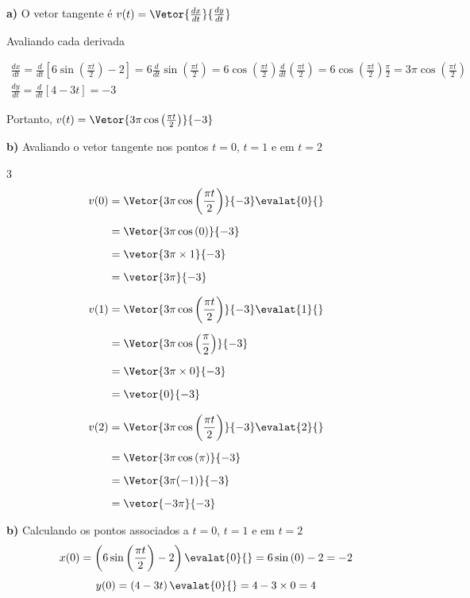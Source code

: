 \documentclass[a4paper,12pt,fleqn]{article}
\begin{document}
\begin{answer}
\textbf{a)} \quad
O vetor tangente é
\(
  v(t) = \Vetor{\frac{dx}{dt}}{\frac{dy}{dt}}
\)

Avaliando cada derivada

\begin{gather*}
  \frac{dx}{dt}
  = \frac{d}{dt}\left[6\sin\left(\frac{\pi t}{2}\right) - 2\right]
  = 6\frac{d}{dt}\sin\left(\frac{\pi t}{2}\right)
  = 6\cos\left(\frac{\pi t}{2}\right)\frac{d}{dt}\left(\frac{\pi t}{2}\right)
  = 6\cos\left(\frac{\pi t}{2}\right)\frac{\pi}{2}
  = 3\pi\cos\left(\frac{\pi t}{2}\right)
  \\[4mm]
\frac{dy}{dt}
  = \frac{d}{dt}\left[4 - 3t\right]
  = -3
\end{gather*}

\medskip
Portanto,
\(
  v(t) = \Vetor{3\pi\cos\left(\frac{\pi t}{2}\right)}{-3}
\)

\clearpage
\textbf{b)} \quad
Avaliando o vetor tangente nos pontos $t=0$, $t=1$ e em $t=2$
\begin{multicols}{3}
\setlength{\mathindent}{0pt}
\begin{align*}
  v(0)
  & = \Vetor{3\pi\cos\left(\frac{\pi t}{2}\right)}{-3} \evalat{0}{} \\[2mm]
  & = \Vetor{3\pi\cos\left(0\right)}{-3} \\[2mm]
  & = \vetor{3\pi\times 1}{-3} \\[2mm]
  & = \vetor{3\pi}{-3}
\end{align*}

\newcolumn
\begin{align*}
  v(1)
  & = \Vetor{3\pi\cos\left(\frac{\pi t}{2}\right)}{-3} \evalat{1}{} \\[2mm]
  & = \Vetor{3\pi\cos\left(\frac{\pi}{2}\right)}{-3} \\[2mm]
  & = \Vetor{3\pi\times 0}{-3} \\[2mm]
  & = \vetor{0}{-3}
\end{align*}

\newcolumn
\begin{align*}
  v(2)
  & = \Vetor{3\pi\cos\left(\frac{\pi t}{2}\right)}{-3} \evalat{2}{} \\[2mm]
  & = \Vetor{3\pi\cos\left(\pi\right)}{-3} \\[2mm]
  & = \Vetor{3\pi(-1)}{-3} \\[2mm]
  & = \vetor{-3\pi}{-3}
\end{align*}
\end{multicols}

\bigskip
\textbf{b)} \quad
Calculando os pontos associados a $t=0$, $t=1$ e em $t=2$
\[
  x(0)
  = \left(6\sin\left(\frac{\pi t}{2}\right) - 2\right)\evalat{0}{}
  = 6\sin\left(0\right) - 2
  = -2
\]
\[
  y(0)
  = \left(4 - 3t\right)\evalat{0}{}
  = 4 - 3\times 0
  = 4
\]


\end{answer}
\end{document}
